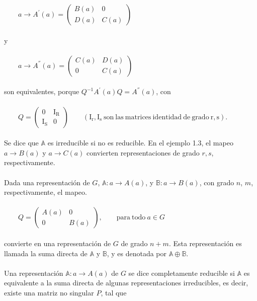 \documentclass[12pt]{book}
\theoremstyle{definition}
\newcounter{in}
\begin{document}
$\qquad 
a \rightarrow A^{'}\left(a\right)=
\begin{pmatrix}
B\left(a\right) & 0 \\
D\left(a\right) & C\left(a\right)
\end{pmatrix}$\\~\\
y\\~\\
$\qquad 
a \rightarrow A^{''}\left(a\right)=
\begin{pmatrix}
C\left(a\right) & D\left(a\right) \\
0 & C\left(a\right)
\end{pmatrix}$\\~\\
son equivalentes, porque $Q^{-1}A^{'}\left(a\right)Q=A^{''}\left(a\right)$, con\\~\\
$\qquad 
Q=
\begin{pmatrix}
0 & \mathrm{I_{R}} \\ 
\mathrm{I_{S}} & 0
\end{pmatrix} \qquad \mathrm{(I_{r},I_{s}\ son\ las\ matrices\ identidad\ de\ grado\ r,s).\ }$\\~\\
Se dice que $\mathbb{A}$ es irreducible si no es reducible. En el ejemplo 1.3, el mapeo $a \rightarrow B\left(a\right)$ y $a \rightarrow C\left(a\right)$ convierten representaciones de grado $r,s$, respectivamente.\\~\\
Dada una representación de $G$, $\mathbb{A}: a \rightarrow A\left(a\right)$, y $\mathbb{B}: a \rightarrow B\left(a\right)$, con grado $n$, $m$, respectivamente, el mapeo.\\~\\
$\qquad 
Q=
\begin{pmatrix}
A\left(a\right) & 0 \\ 
0 & B\left(a\right)
\end{pmatrix}, \qquad \mathrm{para\ todo\ } a \in G$\\~\\
convierte en una representación de $G$ de grado $n+m$. Esta representación es llamada la suma directa de $\mathbb{A}$ y $\mathbb{B}$, y es denotada por $\mathbb{A}\oplus\mathbb{B}$.\\~\\
Una representación $\mathbb{A}: a \rightarrow A\left(a\right)$ de $G$ se dice completamente reducible si $\mathbb{A}$ es equivalente a la suma directa de algunas representaciones irreducibles, es decir, existe una matriz no singular $P$, tal que\\~\\
\end{document}
